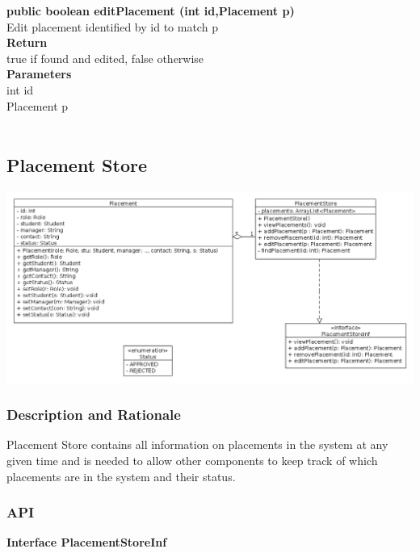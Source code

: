 \documentclass{l3deliverable}
\begin{document}
\textbf{public boolean editPlacement (int id,Placement p)}\\
Edit placement identified by id to match p\\
\textbf{Return}\\
true if found and edited, false otherwise\\
\textbf{Parameters}\\
int id\\
Placement p\\
\\


\subsection{Placement Store}
\includegraphics[scale = 0.4]{ClassDiagram_PlacementStore.png}
\subsubsection{Description and Rationale}
Placement Store contains all information on placements in the system at any given time and is needed to allow other components to keep track of which placements are in the system and their status.
\subsubsection{API}
\textbf{Interface PlacementStoreInf}\\
\end{document}
